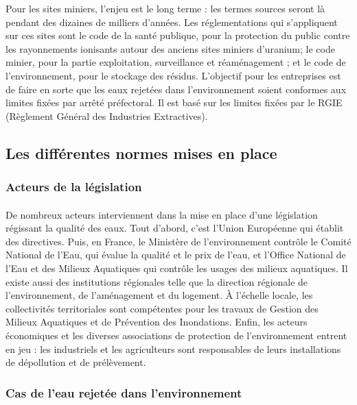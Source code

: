\documentclass{article}
\begin{document}
Pour les sites miniers, l’enjeu est le long terme : les termes sources seront là pendant des dizaines de milliers d’années. Les réglementations qui s’appliquent sur ces sites sont le code de la santé publique, pour la protection du public contre les rayonnements ionisants autour des anciens sites miniers d’uranium; le code minier, pour la partie exploitation, surveillance et réaménagement ; et le code de l’environnement, pour le stockage des résidus. L’objectif pour les entreprises est de faire en sorte que les eaux rejetées dans l’environnement soient conformes aux limites fixées par arrêté préfectoral. Il est  basé sur les limites fixées par le RGIE (Règlement Général des Industries Extractives).


\subsection{Les différentes normes mises en place}%
\subsubsection{Acteurs de la législation}

\paragraph{} De nombreux acteurs interviennent dans la mise en place d’une législation régissant la qualité des eaux. Tout d’abord, c’est l’Union Européenne qui établit des directives. Puis, en France, le  Ministère de l’environnement contrôle le Comité National de l’Eau, qui évalue la qualité et le prix de l’eau, et l’Office National de l’Eau et des Milieux Aquatiques qui contrôle les usages des milieux aquatiques. Il existe aussi des institutions régionales telle que la direction régionale de l’environnement, de l’aménagement et du logement. À l'échelle locale, les collectivités territoriales sont compétentes pour les travaux de Gestion des Milieux Aquatiques et de Prévention des Inondations. Enfin, les acteurs économiques et les diverses associations de protection de l’environnement entrent en jeu : les industriels et les agriculteurs sont responsables de leurs installations de dépollution et de prélèvement.

\subsubsection{Cas de l’eau rejetée dans l’environnement}
\end{document}
